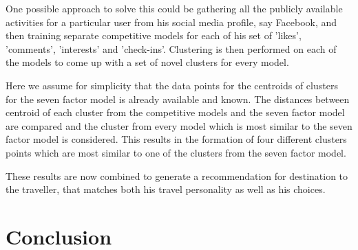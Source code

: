 One possible approach to solve this could be gathering all the publicly available activities for a particular user from his social media profile, say Facebook, and then training separate competitive models for each of his set of 'likes', 'comments', 'interests' and 'check-ins'. Clustering is then performed on each of the models to come up with a set of novel clusters for every model. 

Here we assume for simplicity that the data points for the centroids of clusters for the seven factor model \cite{sertkan2018mapping} is already available and known. The distances between centroid of each cluster from  the competitive models and the seven factor model are compared and the cluster from every model which is most similar to the seven factor model is considered. This results in the formation of four different clusters points which are most similar to one of the clusters from the seven factor model.

These results are now combined to generate a recommendation for destination to the traveller, that matches both his travel personality as well as his choices.
\section{Conclusion}



